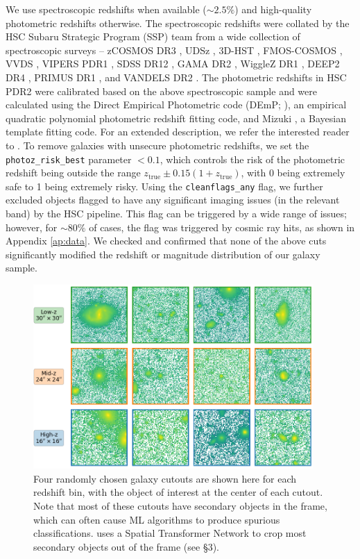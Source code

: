 We use spectroscopic redshifts when available ($\sim 2.5\%$) and high-quality photometric redshifts otherwise. The spectroscopic redshifts were collated by the HSC Subaru Strategic Program (SSP) team from a wide collection of spectroscopic surveys -- zCOSMOS DR3 \citep{lilly_09}, UDSz \citep{bradshaw_13}, 3D-HST \citep{momcheva_16}, FMOS-COSMOS \citep{silverman_15}, VVDS \citep{lefevre_13}, VIPERS PDR1 \citep{garilli_14}, SDSS DR12 \citep{alam_15}, GAMA DR2 \citep{liske_15}, WiggleZ DR1 \citep{drinkwater_10}, DEEP2 DR4 \citep{newman_13}, PRIMUS DR1 \citep{cool_13}, and VANDELS DR2 \citep{vandels}. The photometric redshifts in HSC PDR2 were calibrated based on the above spectroscopic sample and were calculated using the Direct Empirical Photometric code (DEmP; \citeauthor{demp} \citeyear{demp}), an empirical
quadratic polynomial photometric redshift fitting code, and Mizuki \citep{mizuki}, a Bayesian template fitting code. For an extended description, we refer the interested reader to \citet{photoz_hsc_pdr2}. To remove galaxies with unsecure photometric redshifts, we set the \texttt{photoz\_risk\_best} parameter $<0.1$, which controls the risk of the photometric redshift being outside the range $z_{\mathrm{true}} \pm 0.15(1+z_{\mathrm{true}})$, with 0 being extremely safe to 1 being extremely risky. Using the \texttt{cleanflags\_any} flag, we further excluded objects flagged to have any significant imaging issues (in the relevant band) by the HSC pipeline. This flag can be triggered by a wide range of issues; however, for $\sim 80\%$ of cases, the flag was triggered by cosmic ray hits, as shown in Appendix \ref{ap:data}. We checked and confirmed that none of the above cuts significantly modified the redshift or magnitude distribution of our galaxy sample. 

\begin{figure}[htb]
    \centering
    \includegraphics[width = 0.95\textwidth]{real_data_examples.png}
    \caption{Four randomly chosen galaxy cutouts are shown here for each redshift bin, with the object of interest at the center of each cutout. Note that most of these cutouts have secondary objects in the frame, which can often cause ML algorithms to produce spurious classifications. \gampen{} uses a Spatial Transformer Network to crop most secondary objects out of the frame %
    (see \S 3).}
    \label{fig_c3:real_data_eg}
\end{figure}


